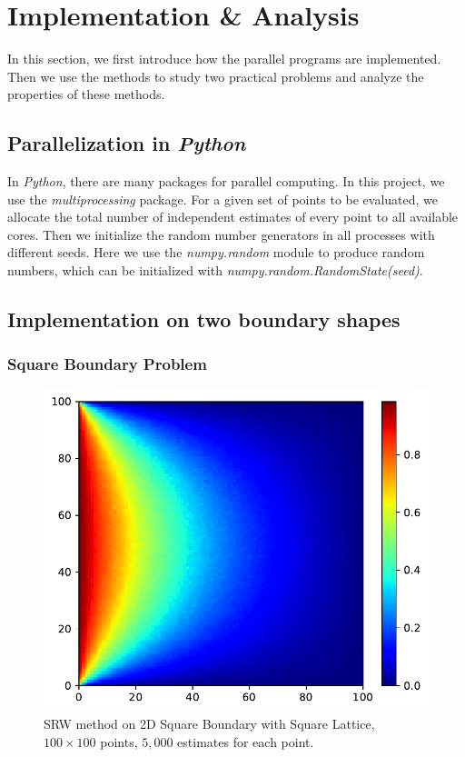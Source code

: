 \documentclass[aps, prl, preprint, groupedaddress]{revtex4-1}
\begin{document}
\section{Implementation \& Analysis}

In this section, we first introduce how the parallel programs are implemented. Then we use the methods to study two practical problems and analyze the properties of these methods.

\subsection{Parallelization in \emph{Python}}

In \emph{Python}, there are many packages for parallel computing. In this project, we use the \emph{multiprocessing} package. For a given set of points to be evaluated, we allocate the total number of independent estimates of every point to all available cores. Then we initialize the random number generators in all processes with different seeds. Here we use the \emph{numpy.random} module to produce random numbers, which can be initialized with \emph{numpy.random.RandomState(seed)}.

\subsection{Implementation on two boundary shapes}

\subsubsection{Square Boundary Problem}

\begin{figure}[htbp]
    \centering
    \includegraphics[width=.8\textwidth]{./figs/srw_s}
    \caption{\label{fig:srw_s} SRW method on 2D Square Boundary with Square Lattice, $100\times 100$ points, $5,000$ estimates for each point.}
\end{figure}
\end{document}

